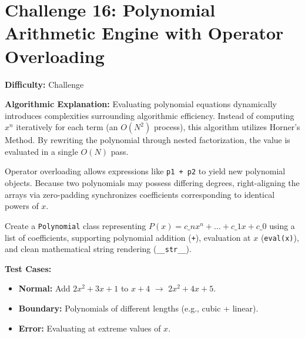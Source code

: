 \section{Challenge 16: Polynomial Arithmetic Engine with Operator Overloading}

\textbf{Difficulty:} Challenge

\textbf{Algorithmic Explanation:}
Evaluating polynomial equations dynamically introduces complexities surrounding algorithmic efficiency. Instead of computing $x^n$ iteratively for each term (an $O(N^2)$ process), this algorithm utilizes Horner's Method. By rewriting the polynomial through nested factorization, the value is evaluated in a single $O(N)$ pass.

Operator overloading allows expressions like \texttt{p1 + p2} to yield new polynomial objects. Because two polynomials may possess differing degrees, right-aligning the arrays via zero-padding synchronizes coefficients corresponding to identical powers of $x$.

\begin{practiceset}
Create a \texttt{Polynomial} class representing $P(x) = c\_n x^n + \dots + c\_1 x + c\_0$ using a list of coefficients, supporting polynomial addition (\texttt{+}), evaluation at $x$ (\texttt{eval(x)}), and clean mathematical string rendering (\texttt{\_\_str\_\_}).

\textbf{Test Cases:}
\begin{itemize}
    \item \textbf{Normal:} Add $2x^2 + 3x + 1$ to $x + 4$ $\rightarrow$ $2x^2 + 4x + 5$.
    \item \textbf{Boundary:} Polynomials of different lengths (e.g., cubic + linear).
    \item \textbf{Error:} Evaluating at extreme values of $x$.
\end{itemize}
\end{practiceset}

